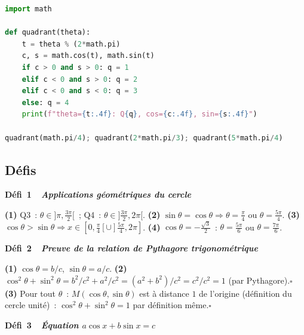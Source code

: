 
\begin{lstlisting}[language=Python]
import math

def quadrant(theta):
    t = theta % (2*math.pi)
    c, s = math.cos(t), math.sin(t)
    if c > 0 and s > 0: q = 1
    elif c < 0 and s > 0: q = 2
    elif c < 0 and s < 0: q = 3
    else: q = 4
    print(f"theta={t:.4f}: Q{q}, cos={c:.4f}, sin={s:.4f}")

quadrant(math.pi/4); quadrant(2*math.pi/3); quadrant(5*math.pi/4)
\end{lstlisting}

\subsection*{D\'efis}

\noindent{}
{\color{BO}\bfseries\small D\'efi~1~\textendash\ \textit{Applications g\'eom\'etriques du cercle}}
\par\smallskip

\textbf{(1)} Q3~: $\theta\in]\pi,\frac{3\pi}{2}[$~; Q4~: $\theta\in]\frac{3\pi}{2},2\pi[$.
\textbf{(2)} $\sin\theta=\cos\theta\Rightarrow\theta=\frac{\pi}{4}$ ou $\theta=\frac{5\pi}{4}$.
\textbf{(3)} $\cos\theta>\sin\theta\Rightarrow x\in[0,\frac{\pi}{4}[\cup]\frac{5\pi}{4},2\pi]$.
\textbf{(4)} $\cos\theta=-\frac{\sqrt{3}}{2}$~: $\theta=\frac{5\pi}{6}$ ou $\theta=\frac{7\pi}{6}$.

\noindent{}
{\color{BO}\bfseries\small D\'efi~2~\textendash\ \textit{Preuve de la relation de Pythagore trigonom\'etrique}}
\par\smallskip

\textbf{(1)} $\cos\theta=b/c$, $\sin\theta=a/c$.
\textbf{(2)} $\cos^2\theta+\sin^2\theta=b^2/c^2+a^2/c^2=(a^2+b^2)/c^2=c^2/c^2=1$ (par Pythagore).\hfill$\square$
\textbf{(3)} Pour tout $\theta$~: $M(\cos\theta,\sin\theta)$ est \`a distance $1$ de l'origine
(d\'efinition du cercle unit\'e)~: $\cos^2\theta+\sin^2\theta=1$ par d\'efinition m\^eme.\hfill$\square$

\noindent{}
{\color{BO}\bfseries\small D\'efi~3~\textendash\ \textit{\'Equation $a\cos x+b\sin x=c$}}
\par\smallskip

